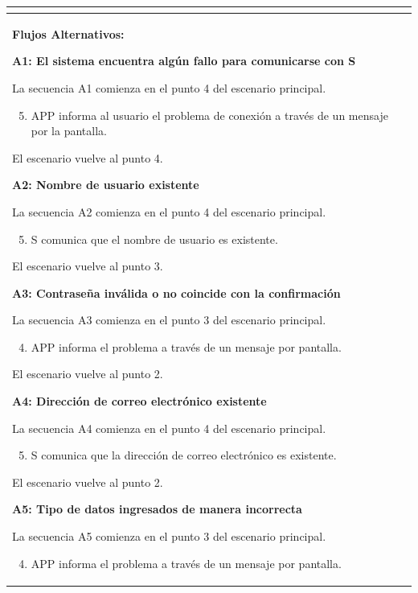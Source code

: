 \begin{longtable}{|l|p{5.5cm}|l|p{2cm}|l|p{1.9cm}|}
{					} \\ \hline

					\multicolumn{6}{|p{15cm}|}{ \textbf{Flujos Alternativos: }

					\textbf{A1: El sistema encuentra algún fallo para comunicarse con S}

					La secuencia A1 comienza en el punto 4 del escenario principal.
					\begin{enumerate}
							\setcounter{enumi}{4}
							\item APP informa al usuario el problema de conexión a través de un mensaje por la pantalla.
					\end{enumerate}

					El escenario vuelve al punto 4.

					\textbf{A2: Nombre de usuario existente}
					
					La secuencia A2 comienza en el punto 4 del escenario principal.
					\begin{enumerate}
							\setcounter{enumi}{4}
							\item S comunica que el nombre de usuario es existente.
					\end{enumerate}

					El escenario vuelve al punto 3.

					\textbf{A3: Contraseña inválida o no coincide con la confirmación}
					
					La secuencia A3 comienza en el punto 3 del escenario principal.
					\begin{enumerate}
							\setcounter{enumi}{3}
							\item APP informa el problema a través de un mensaje por pantalla.
					\end{enumerate}

					El escenario vuelve al punto 2.

					\textbf{A4: Dirección de correo electrónico existente}
					
					La secuencia A4 comienza en el punto 4 del escenario principal.
					\begin{enumerate}
							\setcounter{enumi}{4}
							\item S comunica que la dirección de correo electrónico es existente.
					\end{enumerate}

					El escenario vuelve al punto 2.

					\textbf{A5: Tipo de datos ingresados de manera incorrecta}
					
					La secuencia A5 comienza en el punto 3 del escenario principal.
					\begin{enumerate}
							\setcounter{enumi}{3}
							\item APP informa el problema a través de un mensaje por pantalla.
					\end{enumerate}

}
\end{longtable}
